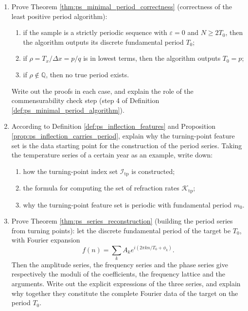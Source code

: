 \begin{enumerate}[leftmargin=3em, label=\textbf{Exercise \arabic*}]
    \item Prove Theorem \ref{thm:ps_minimal_period_correctness} (correctness of the least positive period algorithm):
    \begin{enumerate}[label=(\roman*)]
        \item if the sample is a strictly periodic sequence with $\varepsilon=0$ and $N\ge2T_0$,
              then the algorithm outputs its discrete fundamental period $T_0$;
        \item if $\rho=T_x/\Delta x=p/q$ is in lowest terms,
              then the algorithm outputs $T_0=p$;
        \item if $\rho\notin\mathbb{Q}$, then no true period exists.
    \end{enumerate}
    Write out the proofs in each case, and explain the role of the commensurability check step (step 4 of Definition \ref{def:ps_minimal_period_algorithm}).

    \item According to Definition \ref{def:ps_inflection_features} and Proposition \ref{prop:ps_inflection_carries_period},
    explain why the turning-point feature set is the data starting point for the construction of the period series.
    Taking the temperature series of a certain year as an example, write down:
    \begin{enumerate}[label=(\roman*)]
        \item how the turning-point index set $\mathcal{I}_{\mathrm{tp}}$ is constructed;
        \item the formula for computing the set of refraction rates $\mathcal{K}_{\mathrm{tp}}$;
        \item why the turning-point feature set is periodic with fundamental period $m_0$.
    \end{enumerate}

    \item Prove Theorem \ref{thm:ps_series_reconstruction} (building the period series from turning points):
    let the discrete fundamental period of the target be $T_0$, with Fourier expansion
    \[
    f(n)=\sum_kA_ke^{i(2\pi kn/T_0+\phi_k)}.
    \]
    Then the amplitude series, the frequency series and the phase series give respectively
    the moduli of the coefficients, the frequency lattice and the arguments.
    Write out the explicit expressions of the three series,
    and explain why together they constitute the complete Fourier data of the target on the period $T_0$.


\end{enumerate}
